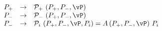 \begin{equation}\label{13}
\begin{array}{rcl}
P_+ &\rightarrow& {\cal P}_+\, \left(P_+, P_-, \vP\right) \nonumber \\
P_- &\rightarrow& {\cal P}_-\, \left(P_+, P_-, \vP\right) \nonumber \\
P_- &\rightarrow& {\cal P}_i\, \left(P_+, P_-, \vP, P_i\right) =
A\left(P_+, P_-, \vP\right)\, P_i
\end{array}
\end{equation}

